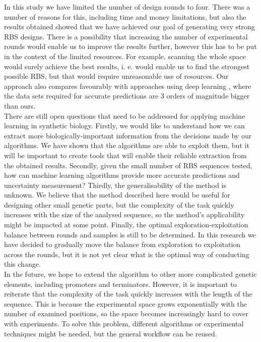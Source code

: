 \documentclass{article}
\begin{document}
In this study we have limited the number of design rounds to four.
There was a number of reasons for this, including time and money limitations, but also the results obtained showed that we have achieved our goal of generating very strong RBS designs.
There is a possibility that increasing the number of experimental rounds would enable us to improve the results further, however this has to be put in the context of the limited resources.
For example, scanning the whole space would surely achieve the best results, i. e. would enable us to find the strongest possible RBS, but that would require unreasonable use of resources.
Our approach also compares favourably with approaches using deep learning \cite{Hollerer2020}, where the data sets required for accurate predictions are 3 orders of magnitude bigger than ours. \\

There are still open questions that need to be addressed for applying machine learning in synthetic biology.
Firstly, we would like to understand how we can extract more biologically-important information from the decisions made by our algorithms.
We have shown that the algorithms are able to exploit them, but it will be important to create tools that will enable their reliable extraction from the obtained results.
Secondly, given the small number of RBS sequences tested, how can machine learning algorithms provide more accurate predictions and uncertainty measurement? 
Thirdly, the generalisability of the method is unknown.
We believe that the method described here would be useful for designing other small genetic parts, but the complexity of the task quickly increases with the size of the analysed sequence, so the method's applicability might be impacted at some point.
Finally, the optimal exploration-exploitation balance between rounds and samples is still to be determined.
In this research we have decided to gradually move the balance from exploration to exploitation across the rounds, but it is not yet clear what is the optimal way of conducting this change.\\

In the future, we hope to extend the algorithm to other more complicated genetic elements, including promoters and terminators.
However, it is important to reiterate that the complexity of the task quickly increases with the length of the sequence.
This is because the experimental space grows exponentially with the number of examined positions, so the space becomes increasingly hard to cover with experiments.
To solve this problem, different algorithms or experimental techniques might be needed, but the general workflow can be reused.\\
\end{document}
